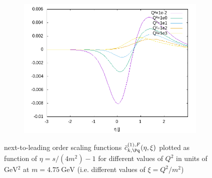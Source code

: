 \begin{figure}[ht!]
\begin{subfigure}[t]{.3\textwidth}
	\includegraphics[width=\textwidth]{../../img2/partonic/dq1_VV_x2g1}
\end{subfigure}%
\caption{next-to-leading order scaling functions $\bar c_{k,\Pq}^{(1),F}(\eta,\xi)$ plotted as function of $\eta=s/(4m^2)-1$ for different values of $Q^2$ in units of $\si{\GeV^2}$ at $m=\SI{4.75}{\GeV}$ (i.e. different values of $\xi=Q^2/m^2$) }\label{fig:dq1}
\end{figure}
